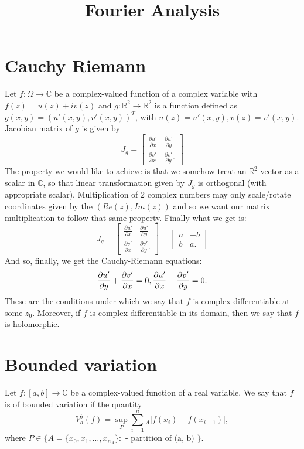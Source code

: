 \documentclass[a4paper, 11pt]{article}
\title{Fourier Analysis}
\newcommand{\Real}{\mathbb{R}}
\newcommand{\Complex}{\mathbb{C}}
\newcommand{\tangentvector}[2]{\frac{\partial #1}{\partial #2}}
\theoremstyle{definition}
\begin{document}
\maketitle
\hypersetup{linkcolor=black}
\tableofcontents

\section{Cauchy Riemann}
Let $f: \Omega \to \Complex$ be a complex-valued function of a complex variable with $f(z) = u(z) + i v(z)$ and $g: \Real^2 \to \Real^2$ is a function defined as $g(x, y) = (u'(x, y), v'(x, y))^T$, with $u(z) = u'(x, y), v(z) = v'(x, y)$.
Jacobian matrix of $g$ is given by
\begin{equation}
	J_g = \begin{bmatrix}
		\tangentvector{u'}{x} & \tangentvector{u'}{y} \\
		\tangentvector{v'}{x} & \tangentvector{v'}{y}.
	\end{bmatrix}
\end{equation}
The property we would like to achieve is that we somehow treat an $\Real^2$ vector as a scalar in $\Complex$, so that linear transformation given by $J_g$ is orthogonal (with appropriate scalar). Multiplication of 2 complex numbers may only scale/rotate coordinates given by the $(Re(z), Im(z))$ and so we want our matrix multiplication to follow that same property. Finally what we get is:
\begin{equation}
	J_g = \begin{bmatrix}
		\tangentvector{u'}{x} & \tangentvector{u'}{y} \\
		\tangentvector{v'}{x} & \tangentvector{v'}{y}.
	\end{bmatrix}
	= \begin{bmatrix}
		a & -b \\
		b & a.
	\end{bmatrix}
\end{equation}
And so, finally, we get the Cauchy-Riemann equations:
\begin{equation}
	\tangentvector{u'}{y} + \tangentvector{v'}{x} = 0, \\
	\tangentvector{u'}{x} - \tangentvector{v'}{y} = 0.
\end{equation}
These are the conditions under which we say that $f$ is complex differentiable at some $z_0$. Moreover, if $f$ is complex differentiable in its domain, then we say that $f$ is holomorphic.

\section{Bounded variation}

Let $f: [a, b] \to \Complex$ be a complex-valued function of a real variable. We say that $f$ is of bounded variation if the quantity
\begin{equation}
	V_a^b(f) = \sup_P \sum_{i=1}^n_A |f(x_i) - f(x_{i-1})|,
\end{equation}
where ${P \in \{A = \{x_0, x_1, \dots, x_{n_A}\}: \text{ - partition of (a, b) } \}}$.
\end{document}
